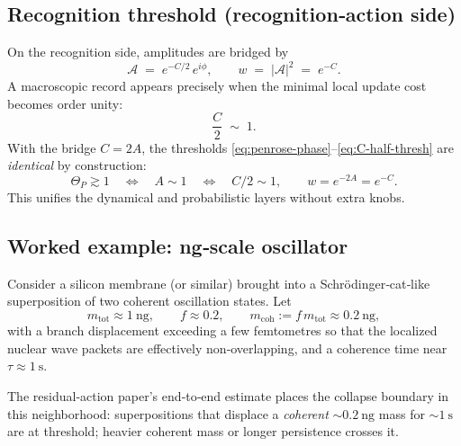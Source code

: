 \documentclass[11pt,letterpaper]{article}
\begin{document}
\subsection{Recognition threshold (recognition‑action side)}

On the recognition side, amplitudes are bridged by
\begin{equation}
\mathcal A \;=\;e^{-C/2}\,e^{i\phi},
\qquad 
w\;=\;|\mathcal A|^2\;=\;e^{-C}.
\end{equation}
A macroscopic record appears precisely when the minimal local update cost becomes order unity:
\begin{equation}
\frac{C}{2}\;\sim\;1.
\label{eq:C-half-thresh}
\end{equation}
With the bridge $C=2A$, the thresholds \eqref{eq:penrose-phase}--\eqref{eq:C-half-thresh} are \emph{identical} by construction:
\begin{equation}
\Theta_P\gtrsim 1 
\quad\Longleftrightarrow\quad 
A\sim 1
\quad\Longleftrightarrow\quad 
C/2\sim 1,
\qquad 
w=e^{-2A}=e^{-C}.
\end{equation}
This unifies the dynamical and probabilistic layers without extra knobs.

\subsection{Worked example: ng‑scale oscillator}

Consider a silicon membrane (or similar) brought into a Schr\"odinger‑cat‑like superposition of two coherent oscillation states. Let
\[
m_{\mathrm{tot}}\approx 1~\mathrm{ng},\qquad f\approx 0.2,\qquad 
m_{\mathrm{coh}}:=f\,m_{\mathrm{tot}}\approx 0.2~\mathrm{ng},
\]
with a branch displacement exceeding a few femtometres so that the localized nuclear wave packets are effectively non‑overlapping, and a coherence time near $\tau\approx 1~\mathrm{s}$.

The residual‑action paper’s end‑to‑end estimate places the collapse boundary in this neighborhood: superpositions that displace a \emph{coherent} $\sim 0.2~\mathrm{ng}$ mass for $\sim 1~\mathrm{s}$ are at threshold; heavier coherent mass or longer persistence crosses it. %
\end{document}
